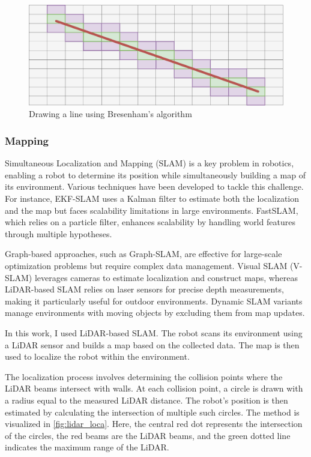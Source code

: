 \documentclass[../main.tex]{subfiles}
\begin{document}
\begin{figure}[H]
	\centering
	\includegraphics[width=0.6\linewidth]{IMAGES/part5/draw_line.png}
	\caption{Drawing a line using Bresenham's algorithm}
	\label{fig:draw_line}
\end{figure}

\subsubsection{Mapping}

Simultaneous Localization and Mapping (SLAM) is a key problem in robotics, enabling a robot to determine its position while simultaneously building a map of its environment. Various techniques have been developed to tackle this challenge. For instance, EKF-SLAM uses a Kalman filter to estimate both the localization and the map but faces scalability limitations in large environments. FastSLAM, which relies on a particle filter, enhances scalability by handling world features through multiple hypotheses.  

\vspace{1em}

Graph-based approaches, such as Graph-SLAM, are effective for large-scale optimization problems but require complex data management. Visual SLAM (V-SLAM) leverages cameras to estimate localization and construct maps, whereas LiDAR-based SLAM relies on laser sensors for precise depth measurements, making it particularly useful for outdoor environments. Dynamic SLAM variants manage environments with moving objects by excluding them from map updates.\cite{ding_2024}

\vspace{1em}

In this work, I used LiDAR-based SLAM. The robot scans its environment using a LiDAR sensor and builds a map based on the collected data. The map is then used to localize the robot within the environment.

\vspace{1em}

The localization process involves determining the collision points where the LiDAR beams intersect with walls. At each collision point, a circle is drawn with a radius equal to the measured LiDAR distance. The robot's position is then estimated by calculating the intersection of multiple such circles. 
The method is visualized in \autoref{fig:lidar_loca}. Here, the central red dot represents the intersection of the circles, the red beams are the LiDAR beams, and the green dotted line indicates the maximum range of the LiDAR.
\end{document}
